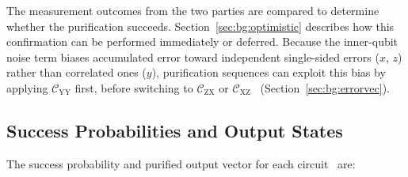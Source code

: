 The measurement outcomes from the two parties are compared to determine whether the purification succeeds. Section~\ref{sec:bg:optimistic} describes how this confirmation can be performed immediately or deferred. Because the inner-qubit noise term biases accumulated error toward independent single-sided errors ($x$, $z$) rather than correlated ones ($y$), purification sequences can exploit this bias by applying $\mathcal C_\mathrm{YY}$ first, before switching to $\mathcal C_\mathrm{ZX}$ or $\mathcal C_\mathrm{XZ}$~\cite{Benchasattabuse2025Integrating} (Section~\ref{sec:bg:errorvec}).

\vspace{0.8cm}

\subsection{Success Probabilities and Output States}
\label{sec:bg:purmath}

The success probability and purified output vector for each circuit~\cite{Benchasattabuse2025Integrating} are:


